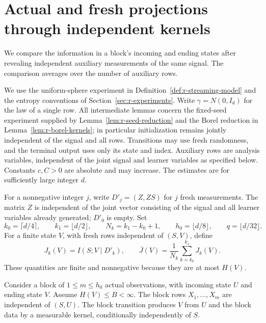 \section{Actual and fresh projections through independent kernels}
\label{rhyb:section}\label{sec:r-hybrids}

We compare the information in a block's incoming and ending states after
revealing independent auxiliary measurements of the same signal.  The
comparison averages over the number of auxiliary rows.

We use the uniform-sphere experiment in
Definition~\ref{def:r-streaming-model} and the entropy conventions of
Section~\ref{sec:r-experiments}.  Write \(\gamma=N(0,I_d)\) for
the law of a single row.  All intermediate lemmas concern the
fixed-seed experiment supplied by Lemma~\ref{lem:r-seed-reduction}
and the Borel reduction in Lemma~\ref{lem:r-borel-kernels}; in
particular initialization remains jointly independent of the signal
and all rows.  Transitions may use fresh randomness, and the terminal
output uses only its state and index.  Auxiliary rows are analysis
variables, independent of the joint signal and learner variables as
specified below.  Constants \(c,C>0\) are absolute and may increase.
The estimates are for sufficiently large integer \(d\).

For a nonnegative integer \(j\), write \(D'_j=(Z,ZS)\) for \(j\) fresh
measurements.  The matrix \(Z\) is independent of the joint vector consisting of the
signal and all learner variables already generated; \(D'_0\) is empty.  Set
\begin{equation}\label{rhyb:parameters}
 k_0=\lceil d/4\rceil,\qquad k_1=\lfloor d/2\rfloor,\qquad
 N_k=k_1-k_0+1,\qquad h_0=\lfloor d/8\rfloor,\qquad
 q=\lfloor d/32\rfloor.
\end{equation}
For a finite state \(V\), with fresh rows independent of \((S,V)\), define
\begin{equation}\label{rhyb:potential}
 J_k(V)=I(S;V\mid D'_k),\qquad
 \overline J(V)=\frac1{N_k}\sum_{k=k_0}^{k_1}J_k(V).
\end{equation}
These quantities are finite and nonnegative because they are at most
\(H(V)\).

Consider a block of \(1\le m\le h_0\) actual observations, with incoming
state \(U\) and ending state \(V\).  Assume \(H(V)\le B<\infty\).
The block rows \(X_1,\ldots,X_m\) are independent of \((S,U)\).  The
block transition produces \(V\) from \(U\) and the block data by a
measurable kernel, conditionally independently of \(S\).

